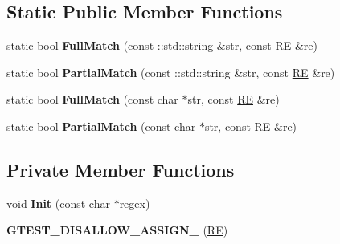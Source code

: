 \subsection*{Static Public Member Functions}
\begin{DoxyCompactItemize}
\item 
\mbox{\label{classtesting_1_1internal_1_1_r_e_aa79a950758d0f1d62f7762d1e9cefe86}} 
static bool {\bfseries Full\+Match} (const \+::std\+::string \&str, const \mbox{\hyperlink{classtesting_1_1internal_1_1_r_e}{RE}} \&re)
\item 
\mbox{\label{classtesting_1_1internal_1_1_r_e_a1e81f9a87211bdca645e025f8f0236c8}} 
static bool {\bfseries Partial\+Match} (const \+::std\+::string \&str, const \mbox{\hyperlink{classtesting_1_1internal_1_1_r_e}{RE}} \&re)
\item 
\mbox{\label{classtesting_1_1internal_1_1_r_e_a2b13ec1f6ccd6c32f7efa01e21588f0b}} 
static bool {\bfseries Full\+Match} (const char $\ast$str, const \mbox{\hyperlink{classtesting_1_1internal_1_1_r_e}{RE}} \&re)
\item 
\mbox{\label{classtesting_1_1internal_1_1_r_e_a97495dd4c2bb9589522823f060c8e8ba}} 
static bool {\bfseries Partial\+Match} (const char $\ast$str, const \mbox{\hyperlink{classtesting_1_1internal_1_1_r_e}{RE}} \&re)
\end{DoxyCompactItemize}
\subsection*{Private Member Functions}
\begin{DoxyCompactItemize}
\item 
\mbox{\label{classtesting_1_1internal_1_1_r_e_a4c3a519ce849abc57d6d5fffbf1e04dc}} 
void {\bfseries Init} (const char $\ast$regex)
\item 
\mbox{\label{classtesting_1_1internal_1_1_r_e_a6a07573fee776f88fe045d067dbebe18}} 
{\bfseries G\+T\+E\+S\+T\+\_\+\+D\+I\+S\+A\+L\+L\+O\+W\+\_\+\+A\+S\+S\+I\+G\+N\+\_\+} (\mbox{\hyperlink{classtesting_1_1internal_1_1_r_e}{RE}})
\end{DoxyCompactItemize}
